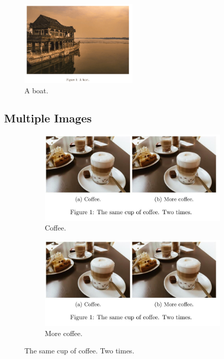 \documentclass{article}
\begin{document}
\begin{figure}[h!]
    \includegraphics[width=0.5\textwidth]{boat.png}
    \caption{A boat.}
    \label{fig:boat1}
  \end{figure}
  

  \subsection{Multiple Images}

\begin{figure}[h!]
    \centering
    \begin{subfigure}[b]{0.4\linewidth}
      \includegraphics[width=\linewidth]{coffee.jpg}
      \caption{Coffee.}
    \end{subfigure}
    \begin{subfigure}[b]{0.4\linewidth}
      \includegraphics[width=\linewidth]{coffee.jpg}
      \caption{More coffee.}
    \end{subfigure}
    \caption{The same cup of coffee. Two times.}
    \label{fig:coffee}
  \end{figure}
  
\end{document}
